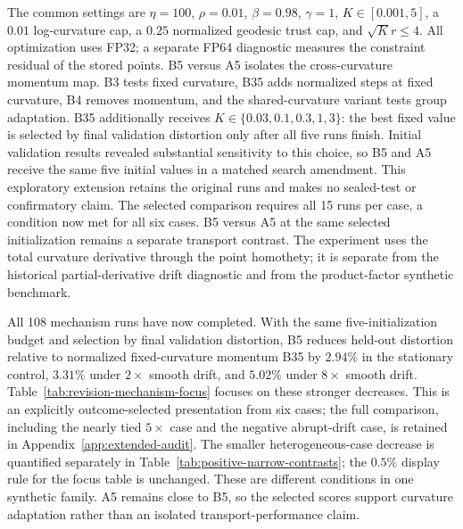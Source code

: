 The common settings are $\eta=100$, $\rho=0.01$, $\beta=0.98$, $\gamma=1$, $K\in[0.001,5]$, a $0.01$ log-curvature cap, a $0.25$ normalized geodesic trust cap, and $\sqrt K r\le4$. All optimization uses FP32; a separate FP64 diagnostic measures the constraint residual of the stored points. B5 versus A5 isolates the cross-curvature momentum map. B3 tests fixed curvature, B35 adds normalized steps at fixed curvature, B4 removes momentum, and the shared-curvature variant tests group adaptation. B35 additionally receives $K\in\{0.03,0.1,0.3,1,3\}$: the best fixed value is selected by final validation distortion only after all five runs finish. Initial validation results revealed substantial sensitivity to this choice, so B5 and A5 receive the same five initial values in a matched search amendment. This exploratory extension retains the original runs and makes no sealed-test or confirmatory claim. The selected comparison requires all 15 runs per case, a condition now met for all six cases. B5 versus A5 at the same selected initialization remains a separate transport contrast. The experiment uses the total curvature derivative through the point homothety; it is separate from the historical partial-derivative drift diagnostic and from the product-factor synthetic benchmark.



All 108 mechanism runs have now completed. With the same five-initialization budget and selection by final validation distortion, B5 reduces held-out distortion relative to normalized fixed-curvature momentum B35 by $2.94\%$ in the stationary control, $3.31\%$ under $2\times$ smooth drift, and $5.02\%$ under $8\times$ smooth drift. Table~\ref{tab:revision-mechanism-focus} focuses on these stronger decreases. This is an explicitly outcome-selected presentation from six cases; the full comparison, including the nearly tied $5\times$ case and the negative abrupt-drift case, is retained in Appendix~\ref{app:extended-audit}. The smaller heterogeneous-case decrease is quantified separately in Table~\ref{tab:positive-narrow-contrasts}; the $0.5\%$ display rule for the focus table is unchanged. These are different conditions in one synthetic family. A5 remains close to B5, so the selected scores support curvature adaptation rather than an isolated transport-performance claim.

